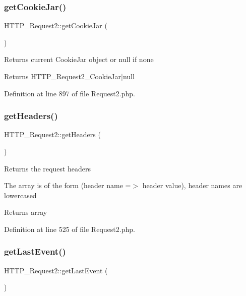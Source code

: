 \subsubsection{\texorpdfstring{get\+Cookie\+Jar()}{getCookieJar()}}
{\footnotesize\ttfamily H\+T\+T\+P\+\_\+\+Request2\+::get\+Cookie\+Jar (\begin{DoxyParamCaption}{ }\end{DoxyParamCaption})}

Returns current Cookie\+Jar object or null if none

\begin{DoxyReturn}{Returns}
H\+T\+T\+P\+\_\+\+Request2\+\_\+\+Cookie\+Jar$\vert$null 
\end{DoxyReturn}


Definition at line 897 of file Request2.\+php.

\hypertarget{classHTTP__Request2_a49ae39a8a6531b205b15496e42b994cf}{}\label{classHTTP__Request2_a49ae39a8a6531b205b15496e42b994cf} 
\subsubsection{\texorpdfstring{get\+Headers()}{getHeaders()}}
{\footnotesize\ttfamily H\+T\+T\+P\+\_\+\+Request2\+::get\+Headers (\begin{DoxyParamCaption}{ }\end{DoxyParamCaption})}

Returns the request headers

The array is of the form (\textquotesingle{}header name\textquotesingle{} =$>$ \textquotesingle{}header value\textquotesingle{}), header names are lowercased

\begin{DoxyReturn}{Returns}
array 
\end{DoxyReturn}


Definition at line 525 of file Request2.\+php.

\hypertarget{classHTTP__Request2_afe70adf8c72a426f80ce66b4170e0f61}{}\label{classHTTP__Request2_afe70adf8c72a426f80ce66b4170e0f61} 
\subsubsection{\texorpdfstring{get\+Last\+Event()}{getLastEvent()}}
{\footnotesize\ttfamily H\+T\+T\+P\+\_\+\+Request2\+::get\+Last\+Event (\begin{DoxyParamCaption}{ }\end{DoxyParamCaption})}

